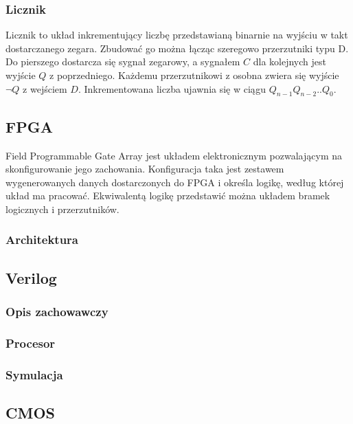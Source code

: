 \documentclass[a4paper,12pt]{article}
\begin{document}
\subsubsection{Licznik}

Licznik to układ inkrementujący liczbę przedstawianą binarnie na wyjściu w takt dostarczanego zegara. Zbudować go można łącząc szeregowo przerzutniki typu D. Do pierszego dostarcza się sygnał zegarowy, a sygnałem $C$ dla kolejnych jest wyjście $Q$ z poprzedniego. Każdemu przerzutnikowi z osobna zwiera się wyjście $\lnot Q$ z wejściem $D$. Inkrementowana liczba ujawnia się w ciągu $Q_{n-1} Q_{n-2} .. Q_{0}$.

\subsection{FPGA}

Field Programmable Gate Array jest układem elektronicznym pozwalającym na skonfigurowanie jego zachowania. Konfiguracja taka jest zestawem wygenerowanych danych dostarczonych do FPGA i określa logikę, według której układ ma pracować. Ekwiwalentą logikę przedstawić można układem bramek logicznych i przerzutników.

\subsubsection{Architektura}



\subsection{Verilog}

\subsubsection{Opis zachowawczy}

\subsubsection{Procesor}

\subsubsection{Symulacja}


\subsection{CMOS}
\end{document}
